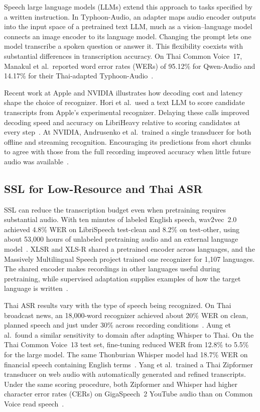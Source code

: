 \documentclass[conference]{IEEEtran}
\begin{document}
Speech large language models (LLMs) extend this approach to tasks specified by a written instruction. In Typhoon-Audio, an adapter maps audio encoder outputs into the input space of a pretrained text LLM, much as a vision--language model connects an image encoder to its language model. Changing the prompt lets one model transcribe a spoken question or answer it. This flexibility coexists with substantial differences in transcription accuracy. On Thai Common Voice~17, Manakul et al.\ reported word error rates (WERs) of 95.12\% for Qwen-Audio and 14.17\% for their Thai-adapted Typhoon-Audio~\cite{manakul2025typhoonaudio}.

Recent work at Apple and NVIDIA illustrates how decoding cost and latency shape the choice of recognizer. Hori et al.\ used a text LLM to score candidate transcripts from Apple's experimental recognizer. Delaying these calls improved decoding speed and accuracy on LibriHeavy relative to scoring candidates at every step~\cite{hori2025fusion}. At NVIDIA, Andrusenko et al.\ trained a single transducer for both offline and streaming recognition. Encouraging its predictions from short chunks to agree with those from the full recording improved accuracy when little future audio was available~\cite{andrusenko2026unified}.

\subsection{SSL for Low-Resource and Thai ASR}
SSL can reduce the transcription budget even when pretraining requires substantial audio. With ten minutes of labeled English speech, wav2vec~2.0 achieved 4.8\% WER on LibriSpeech test-clean and 8.2\% on test-other, using about 53{,}000 hours of unlabeled pretraining audio and an external language model~\cite{baevski2020wav2vec2}. XLSR and XLS-R shared a pretrained encoder across languages, and the Massively Multilingual Speech project trained one recognizer for 1{,}107 languages. The shared encoder makes recordings in other languages useful during pretraining, while supervised adaptation supplies examples of how the target language is written~\cite{conneau2021xlsr,babu2022xlsr,pratap2023mms}.

Thai ASR results vary with the type of speech being recognized. On Thai broadcast news, an 18{,}000-word recognizer achieved about 20\% WER on clean, planned speech and just under 30\% across recording conditions~\cite{jongtaveesataporn2008news}. Aung et al.\ found a similar sensitivity to domain after adapting Whisper to Thai. On the Thai Common Voice~13 test set, fine-tuning reduced WER from 12.8\% to 5.5\% for the large model. The same Thonburian Whisper model had 18.7\% WER on financial speech containing English terms~\cite{aung2024thonburian}. Yang et al.\ trained a Thai Zipformer transducer on web audio with automatically generated and refined transcripts. Under the same scoring procedure, both Zipformer and Whisper had higher character error rates (CERs) on GigaSpeech~2 YouTube audio than on Common Voice read speech~\cite{yang2025gigaspeech}.
\end{document}
